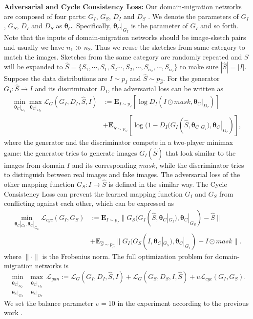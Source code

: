 \documentclass[runningheads]{llncs}
\begin{document}
\noindent\textbf{Adversarial and Cycle Consistency Loss:} Our domain-migration networks are composed of four parts: $G_I$, $G_S$, $D_I$ and $D_S$ \cite{ZhuPIE17}.  We denote the parameters of $G_I$, $G_S$, $D_I$ and $D_S$ as $\bm{\theta}_C$. Specifically, $\bm{\theta}_C|_{G_I}$ is the parameter of $G_I$ and so forth. Note that the inputs of domain-migration networks should be image-sketch pairs and usually we have $n_1 \gg n_2$. Thus we reuse the sketches from same category to match the images. Sketches from the same category are randomly repeated and $S$ will be expanded to $\hat{S} =  \{ S_1,\cdots,S_1, S_2 \cdots,S_2, \cdots, S_{n_2},\cdots,S_{n_2}  \}$ to make sure $|\hat{S}| = |I|$.  Suppose the data distributions are $I \sim p_{I}$ and $\hat{S} \sim p_{\hat{S}}$. For the generator $G_I : \hat{S}\rightarrow I$ and its discriminator $D_I$, the adversarial loss can be written as
\begin{equation}\label{eq:equiv1}
\begin{split}
	\min_{\bm{\theta}_C|_{G_I}} \max_{\bm{\theta}_C|_{D_I}} \mathcal{L}_{G}(G_I,D_I,\hat{S},I) & := \mathbf{E}_{I \sim p_{I}}[\log D_I(I \odot mask, \bm{\theta}_C|_{D_I})]\\
	& + \mathbf{E}_{\hat{S} \sim p_{\hat{S}}}[\log(1 - D_I(G_I(\hat{S}, \bm{\theta}_C|_{G_I}), \bm{\theta}_C|_{D_I})],
\end{split}
\end{equation}
where the generator and the discriminator compete in a two-player minimax game: the generator tries to generate images $G_I(\hat{S})$ that look similar to the images from domain $I$ and its corresponding $mask$, while the discriminator tries to distinguish between real images and fake images. The adversarial loss of the other mapping function $G_S : I\rightarrow \hat{S}$ is defined in the similar way. The Cycle Consistency Loss can prevent the learned mapping function $G_I$ and $G_S$ from conflicting against each other, which can be expressed as
\begin{equation}\label{eq:equiv2}
\begin{split}
	\min_{\bm{\theta}_C|_{G_I}, \bm{\theta}_C|_{G_S}}  \mathcal{L}_{cyc}(G_I,G_S)& := \mathbf{E}_{I \sim p_{I}} \| G_S ( G_I ( \hat{S}, \bm{\theta}_C|_{G_I}  ),  \bm{\theta}_C|_{G_S}  )-\hat{S}  \| \\
	&+ \mathbf{E}_{\hat{S} \sim p_{\hat{S}}} \| G_I ( G_S ( I , \bm{\theta}_C|_{G_S} ), \bm{\theta}_C|_{G_I}  )-I \odot mask  \|.
\end{split}
\end{equation}
where $\|\cdot \|$ is the Frobenius norm. The full optimization problem for domain-migration networks is
\begin{equation}\label{eq:equiv3}
 \min_{\substack{\bm{\theta}_C|_{G_I} \\ \bm{\theta}_C|_{G_S}}}  \max_{\substack{\bm{\theta}_C|_{D_I} \\ \bm{\theta}_C|_{D_S}}} \mathcal{L}_{gan} 
:= \mathcal{L}_{G}(G_I,D_I,\hat{S},I) + \mathcal{L}_{G}(G_S,D_S,I,\hat{S}) + \upsilon\mathcal{L}_{cyc}(G_I,G_S).
\end{equation}
We set the balance parameter $\upsilon = 10$ in the experiment according to the previous work \cite{ZhuPIE17}.
\end{document}
